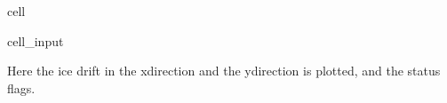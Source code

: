 \documentclass[letterpaper,10pt,english]{jupyterBook}
\begin{document}
\begin{sphinxuseclass}{cell}\begin{sphinxVerbatimInput}

\begin{sphinxuseclass}{cell_input}
\begin{sphinxVerbatim}[commandchars=\\\{\}]

  \PYG{p}{[}  \PYG{p}{]}
     
\end{sphinxVerbatim}

\end{sphinxuseclass}\end{sphinxVerbatimInput}

\end{sphinxuseclass}
\sphinxAtStartPar
Here the ice drift in the x\sphinxhyphen{}direction and the y\sphinxhyphen{}direction is plotted, and the status flags.
\end{document}
